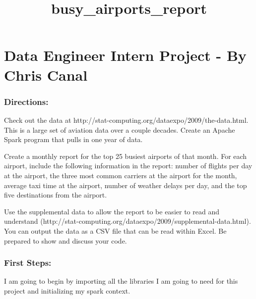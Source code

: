 \documentclass[11pt]{article}
\title{busy\_airports\_report}
\begin{document}
    
    
    \maketitle
    
    

    
    \section{Data Engineer Intern Project - By Chris
Canal}\label{data-engineer-intern-project---by-chris-canal}

\subsubsection{Directions:}\label{directions}

Check out the data at
http://stat-computing.org/dataexpo/2009/the-data.html. This is a large
set of aviation data over a couple decades. Create an Apache Spark
program that pulls in one year of data.

Create a monthly report for the top 25 busiest airports of that month.
For each airport, include the following information in the report:
number of flights per day at the airport, the three most common carriers
at the airport for the month, average taxi time at the airport, number
of weather delays per day, and the top five destinations from the
airport.

Use the supplemental data to allow the report to be easier to read and
understand
(http://stat-computing.org/dataexpo/2009/supplemental-data.html). You
can output the data as a CSV file that can be read within Excel. Be
prepared to show and discuss your code.

    \subsubsection{First Steps:}\label{first-steps}

I am going to begin by importing all the libraries I am going to need
for this project and initializing my spark context.
\end{document}
